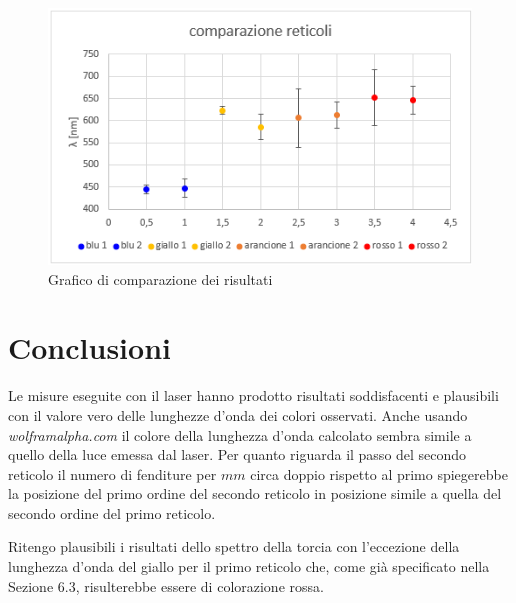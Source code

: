 \documentclass{article}
\begin{document}
\begin{figure}[h!] 
  \centering
  \includegraphics[width=0.6\linewidth]{IM grafico risultati}
  \caption{Grafico di comparazione dei risultati}
\end{figure}



\pagebreak
\section{Conclusioni}
Le misure eseguite con il laser hanno prodotto risultati soddisfacenti e plausibili con il valore vero delle lunghezze d'onda dei colori osservati. Anche usando \textit{wolframalpha.com} il colore della lunghezza d'onda calcolato sembra simile a quello della luce emessa dal laser. Per quanto riguarda il passo del secondo reticolo il numero di fenditure per $mm$ circa doppio rispetto al primo spiegerebbe la posizione del primo ordine del secondo reticolo in posizione simile a quella del secondo ordine del primo reticolo. 

\vspace{3mm}

Ritengo plausibili i risultati dello spettro della torcia con l'eccezione della lunghezza d'onda del giallo per il primo reticolo che, come già specificato nella Sezione 6.3, risulterebbe essere di colorazione rossa.
\end{document}
